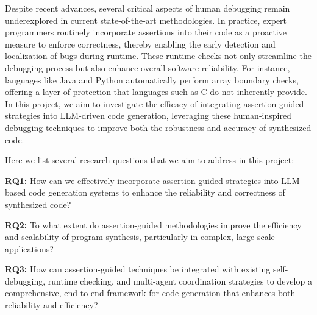 Despite recent advances, several critical aspects of human debugging remain underexplored in current state-of-the-art methodologies. In practice, expert programmers routinely incorporate assertions into their code as a proactive measure to enforce correctness, thereby enabling the early detection and localization of bugs during runtime. These runtime checks not only streamline the debugging process but also enhance overall software reliability. For instance, languages like Java and Python automatically perform array boundary checks, offering a layer of protection that languages such as C do not inherently provide. In this project, we aim to investigate the efficacy of integrating assertion-guided strategies into LLM-driven code generation, leveraging these human-inspired debugging techniques to improve both the robustness and accuracy of synthesized code.

Here we list several research questions that we aim to address in this project:

\textbf{RQ1:} How can we effectively incorporate assertion-guided strategies into LLM-based code generation systems to enhance the reliability and correctness of synthesized code?

\textbf{RQ2:} To what extent do assertion-guided methodologies improve the efficiency and scalability of program synthesis, particularly in complex, large-scale applications?

\textbf{RQ3:} How can assertion-guided techniques be integrated with existing self-debugging, runtime checking, and multi-agent coordination strategies to develop a comprehensive, end-to-end framework for code generation that enhances both reliability and efficiency?



